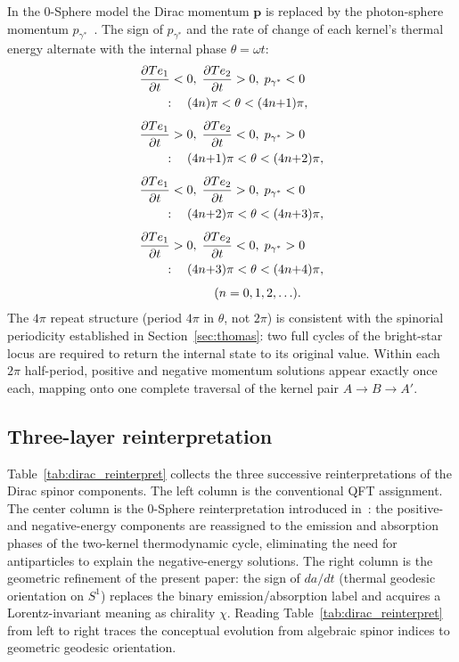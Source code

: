 \documentclass[%
 reprint, amsmath,amssymb, aps, prb, ]{revtex4-2}
\numberwithin{equation}{section}
\newcommand{\iphase}{\theta}
\begin{document}
In the 0-Sphere model the Dirac momentum $\mathbf{p}$ is replaced by the photon-sphere momentum $p_{\gamma^*}$~\cite{hanamura07}. The sign of $p_{\gamma^*}$ and the rate of change of each kernel's thermal energy alternate with the internal phase $\iphase = \omega t$:
\begin{align}
&\frac{\partial Te_1}{\partial t}<0,\;\frac{\partial Te_2}{\partial t}>0,\;p_{\gamma^*}<0\notag\\
&\qquad:\quad (4n)\pi < \iphase < (4n{+}1)\pi,\notag\\[4pt]
&\frac{\partial Te_1}{\partial t}>0,\;\frac{\partial Te_2}{\partial t}<0,\;p_{\gamma^*}>0\notag\\
&\qquad:\quad (4n{+}1)\pi < \iphase < (4n{+}2)\pi,\notag\\[4pt]
&\frac{\partial Te_1}{\partial t}<0,\;\frac{\partial Te_2}{\partial t}>0,\;p_{\gamma^*}<0\notag\\
&\qquad:\quad (4n{+}2)\pi < \iphase < (4n{+}3)\pi,\notag\\[4pt]
&\frac{\partial Te_1}{\partial t}>0,\;\frac{\partial Te_2}{\partial t}<0,\;p_{\gamma^*}>0\notag\\
&\qquad:\quad (4n{+}3)\pi < \iphase < (4n{+}4)\pi,\notag\\[4pt]
&\hspace{6em}(n=0,1,2,\ldots).\label{eq:phase_momentum_table}
\end{align}
The $4\pi$ repeat structure (period $4\pi$ in $\iphase$, not $2\pi$) is consistent with the spinorial periodicity established in Section~\ref{sec:thomas}: two full cycles of the bright-star locus are required to return the internal state to its original value. Within each $2\pi$ half-period, positive and negative momentum solutions appear exactly once each, mapping onto one complete traversal of the kernel pair $A\to B\to A'$.

\subsection{Three-layer reinterpretation}
\label{app:reinterpret}

Table~\ref{tab:dirac_reinterpret} collects the three successive reinterpretations of the Dirac spinor components. The left column is the conventional QFT assignment. The center column is the 0-Sphere reinterpretation introduced in~\cite{hanamura07}: the positive- and negative-energy components are reassigned to the emission and absorption phases of the two-kernel thermodynamic cycle, eliminating the need for antiparticles to explain the negative-energy solutions. The right column is the geometric refinement of the present paper: the sign of $da/dt$ (thermal geodesic orientation on $S^1$) replaces the binary emission/absorption label and acquires a Lorentz-invariant meaning as chirality $\chi$. Reading Table~\ref{tab:dirac_reinterpret} from left to right traces the conceptual evolution from algebraic spinor indices to geometric geodesic orientation.
\end{document}
